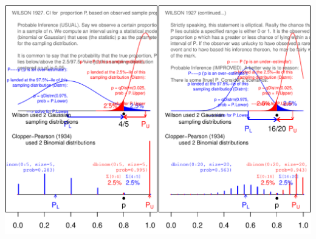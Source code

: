 \documentclass[10pt,handout]{beamer}\usepackage[]{graphicx}\usepackage[]{color}
\makeatletter
\def\maxwidth{ %
  \ifdim\Gin@nat@width>\linewidth
    \linewidth
  \else
    \Gin@nat@width
  \fi
}
\newenvironment{knitrout}{}{} %
\makeatother
\begin{document}
\begin{frame}
\begin{knitrout}\tiny
{}\color{fgcolor}

{\centering \includegraphics[width=\maxwidth]{figure/wilson-1} 

}


\end{knitrout}
\end{frame}
\end{document}
